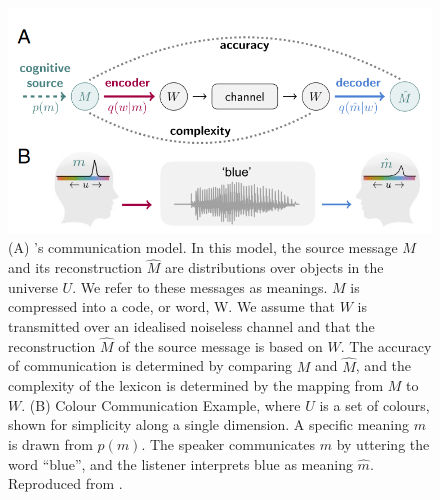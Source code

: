 \begin{figure}[hbt!]\centering
\includegraphics[width=1\textwidth]{image/lit/datacompress1.PNG}
\caption[(A) Shannon's communication model. In this model, the source message $M$ and its reconstruction $\hat{M}$ are distributions over objects in the universe $U$. We refer to these messages as meanings. $M$ is compressed into a code, or word, W. We assume that $W$ is transmitted over an idealised noiseless channel and that the reconstruction $\hat{M}$ of the source message is based on $W$. The accuracy of communication is determined by comparing $M$ and $\hat{M}$, and the complexity of the lexicon is determined by the mapping from $M$ to $W$. 
(B) Colour Communication Example,  where $U$ is a set of colours, shown for simplicity along a single dimension. A specific meaning $m$ is drawn from $p(m)$. The speaker communicates $m$ by uttering the word “blue”, and the listener interprets blue as meaning $\hat{m}$.
]
{(A) 's communication model. In this model, the source message $M$ and its reconstruction $\hat{M}$ are distributions over objects in the universe $U$. We refer to these messages as meanings. $M$ is compressed into a code, or word, W. We assume that $W$ is transmitted over an idealised noiseless channel and that the reconstruction $\hat{M}$ of the source message is based on $W$. The accuracy of communication is determined by comparing $M$ and $\hat{M}$, and the complexity of the lexicon is determined by the mapping from $M$ to $W$. 
(B) Colour Communication Example,  where $U$ is a set of colours, shown for simplicity along a single dimension. A specific meaning $m$ is drawn from $p(m)$. The speaker communicates $m$ by uttering the word “blue”, and the listener interprets blue as meaning $\hat{m}$.
Reproduced from .}
\label{fig:datacompression1}
\end{figure}

